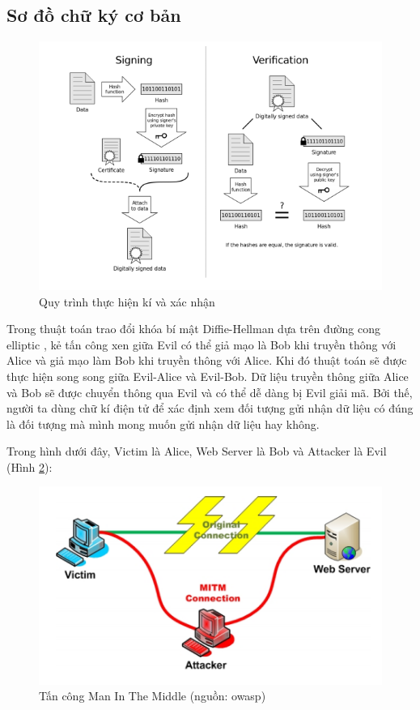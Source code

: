 \documentclass[a4paper,12pt]{report}
\begin{document}
\subsection*{Sơ đồ chữ ký cơ bản}
\begin{center}
\begin{figure}[H] 
\centering
\includegraphics[width=0.8\linewidth]{../im20.png}
\caption{Quy trình thực hiện kí và xác nhận} \label{sign1}
\end{figure}
\end{center}

Trong thuật toán trao đổi khóa bí mật Diffie-Hellman  dựa trên đường cong elliptic , kẻ tấn công xen giữa Evil có thể giả mạo là Bob khi truyền thông với Alice và giả mạo làm Bob khi truyền thông với Alice. Khi đó thuật toán sẽ được thực hiện song song giữa Evil-Alice và Evil-Bob. Dữ liệu truyền thông giữa Alice và Bob sẽ được chuyển thông qua Evil và có thể dễ dàng bị Evil giải mã. Bởi thế, người ta dùng chữ kí điện tử để xác định xem đối tượng gửi nhận dữ liệu có đúng là đối tượng mà mình mong muốn gửi nhận dữ liệu hay không.

Trong hình dưới đây, Victim là Alice, Web Server là Bob và Attacker là Evil (Hình \ref{sign2}):
\begin{center}
\begin{figure}[H] 
\centering
\includegraphics[width=0.65\linewidth]{../im21.png}
\caption{Tấn công Man In The Middle (nguồn: owasp) } \label{sign2}
\end{figure}
\end{center}
\end{document}
